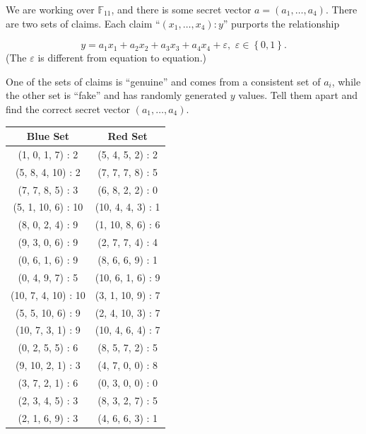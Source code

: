\begin{problem}
We are working over \(\mathbb{F}_{11}\), and there is some secret vector
\(a = \left( a_{1},\ldots,a_{4} \right)\). There are two sets of claims.
Each claim ``\(\left( x_{1},\ldots,x_{4} \right):y\)'' purports the
relationship

\[y = a_{1}x_{1} + a_{2}x_{2} + a_{3}x_{3} + a_{4}x_{4} + \varepsilon,\mspace{6mu}\varepsilon \in \left\{ 0,1 \right\}.\]
(The \(\varepsilon\) is different from equation to equation.)

One of the sets of claims is ``genuine'' and comes from a consistent set
of \(a_{i}\), while the other set is ``fake'' and has randomly generated
\(y\) values. Tell them apart and find the correct secret vector
\(\left( a_{1},\ldots,a_{4} \right)\).

\begin{center}
\begin{tabular}{|c|c|}
\hline
Blue Set & Red Set \\
\hline\hline
(1, 0, 1, 7) : 2 & (5, 4, 5, 2) : 2 \\
\hline
(5, 8, 4, 10) : 2 & (7, 7, 7, 8) : 5 \\
\hline
(7, 7, 8, 5) : 3 & (6, 8, 2, 2) : 0 \\
\hline
(5, 1, 10, 6) : 10 & (10, 4, 4, 3) : 1 \\
\hline
(8, 0, 2, 4) : 9 & (1, 10, 8, 6) : 6 \\
\hline
(9, 3, 0, 6) : 9 & (2, 7, 7, 4) : 4 \\
\hline
(0, 6, 1, 6) : 9 & (8, 6, 6, 9) : 1 \\
\hline
(0, 4, 9, 7) : 5 & (10, 6, 1, 6) : 9 \\
\hline
(10, 7, 4, 10) : 10 & (3, 1, 10, 9) : 7 \\
\hline
(5, 5, 10, 6) : 9 & (2, 4, 10, 3) : 7 \\
\hline
(10, 7, 3, 1) : 9 & (10, 4, 6, 4) : 7 \\
\hline
(0, 2, 5, 5) : 6 & (8, 5, 7, 2) : 5 \\
\hline
(9, 10, 2, 1) : 3 & (4, 7, 0, 0) : 8 \\
\hline
(3, 7, 2, 1) : 6 & (0, 3, 0, 0) : 0 \\
\hline
(2, 3, 4, 5) : 3 & (8, 3, 2, 7) : 5 \\
\hline
(2, 1, 6, 9) : 3 & (4, 6, 6, 3) : 1 \\
\hline
\end{tabular}
\end{center}

\end{problem}

